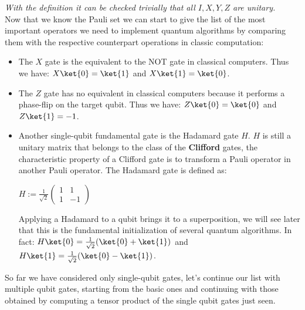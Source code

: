 \documentclass[english]{article}
\begin{document}
			\emph{With the definition it can be checked trivially that all $I, X, Y, Z$ are unitary.}\\
			
			Now that we know the Pauli set we can start to give the list of the most important operators we need to implement quantum algorithms by comparing them with the respective counterpart operations in classic computation:
			
			\begin{itemize} 
				\item The $X$ gate is the equivalent to the NOT gate in classical computers. Thus we have: $X\ket{0} = \ket{1}$ and $X\ket{1} = \ket{0}$. 
				
				\item The $Z$ gate has no equivalent in classical computers because it performs a phase-flip on the target qubit. Thus we have: $Z\ket{0} = \ket{0}$ and $Z\ket{1}=-1$.
				
				\item Another single-qubit fundamental gate is the Hadamard gate $H$. $H$ is still a unitary matrix that belongs to the class of the \textbf{Clifford} gates, the characteristic property of a Clifford gate is to transform a Pauli operator in another Pauli operator. The Hadamard gate is defined as:
				\begin{center}
					$
					H := \frac{1}{\sqrt{2}}
					\begin{pmatrix}
						1 & 1 \\
						1 & -1
					\end{pmatrix}
					$
				\end{center}
				Applying a Hadamard to a qubit brings it to a superposition, we will see later that this is the fundamental initialization of several quantum algorithms. In fact: $H\ket{0} = \frac{1}{\sqrt{2}}(\ket{0}+\ket{1})$ and $H\ket{1}=\frac{1}{\sqrt{2}}(\ket{0}-\ket{1})$. 
			\end{itemize}
			
			So far we have considered only single-qubit gates, let's continue our list with multiple qubit gates, starting from the basic ones and continuing with those obtained by computing a tensor product of the single qubit gates just seen.
			
\end{document}
